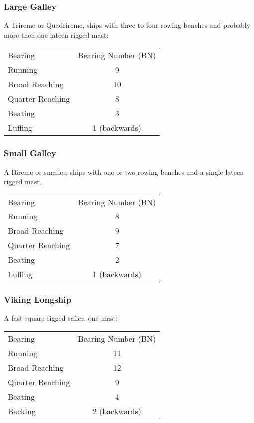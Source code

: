 \documentclass[11pt]{wbzine}
\begin{document}
\begin{multicols}{2}
\subsubsection{Large Galley}

A Trireme or Quadrireme, ships with three to four rowing benches and
probably more then one lateen rigged mast:

\begin{tabularx}{\columnwidth}{Zc}
Bearing & Bearing Number (BN) \\
Running & 9 \\
Broad Reaching & 10 \\
Quarter Reaching & 8 \\
Beating & 3 \\
Luffing & 1 (backwards) \\
\end{tabularx}

\subsubsection{Small Galley}

A Bireme or smaller, ships with one or two rowing benches and a single
lateen rigged mast.

\begin{tabularx}{\columnwidth}{Zc}
Bearing & Bearing Number (BN) \\
Running & 8 \\
Broad Reaching & 9 \\
Quarter Reaching & 7 \\
Beating & 2 \\
Luffing & 1 (backwards) \\
\end{tabularx}

\subsubsection{Viking Longship}

A fast square rigged sailer, one mast:

\begin{tabularx}{\columnwidth}{Zc}
Bearing & Bearing Number (BN) \\
Running & 11 \\
Broad Reaching & 12 \\
Quarter Reaching & 9 \\
Beating & 4 \\
Backing & 2 (backwards) \\
\end{tabularx}


\end{multicols}
\end{document}
